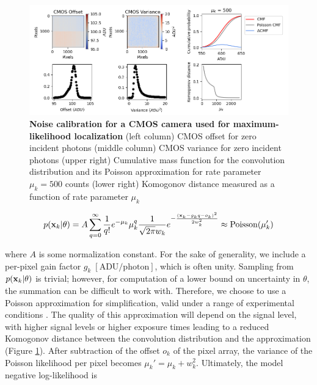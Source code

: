 \begin{figure}[t]
\begin{center}
\includegraphics[width=16cm]{media/Noise.png}
\end{center}
\caption{\textbf{Noise calibration for a CMOS camera used for maximum-likelihood localization} (left column) CMOS offset for zero incident photons (middle column) CMOS variance for zero incident photons (upper right) Cumulative mass function for the convolution distribution and its Poisson approximation for rate parameter $\mu_{k} = 500$ counts (lower right) Komogonov distance measured as a function of rate parameter $\mu_{k}$}
\label{fig:fig2}
\end{figure}

\begin{equation}
p(\bold{x}_{k}\lvert\theta) = A\sum_{q=0}^{\infty} \frac{1}{q!}e^{-\mu_{k}}\mu_{k}^{q}\frac{1}{\sqrt{2\pi}w_{k}}e^{-\frac{(\bold{x}_{k}-g_{k}q-o_{k})^2}{2 w_{k}^{2}}} \approx \mathrm{Poisson}(\mu_{k}')
\end{equation}

where $A$ is some normalization constant. For the sake of generality, we include a per-pixel gain factor $g_{k} \; [\mathrm{ADU}/\mathrm{photon}]$, which is often unity. Sampling from $p(\bold{x}_{k}\lvert\theta)$ is trivial; however, for computation of a lower bound on uncertainty in $\theta$, the summation can be difficult to work with. Therefore, we choose to use a Poisson approximation for simplification, valid under a range of experimental conditions \parencite{Huang2013}. The quality of this approximation will depend on the signal level, with higher signal levels or higher exposure times leading to a reduced Komogonov distance between the convolution distribution and the approximation (Figure \ref{fig:fig2}). After subtraction of the offset $o_{k}$ of the pixel array, the variance of the Poisson likelihood per pixel  becomes $\mu_{k}' = \mu_{k} + w_{k}^{2}$. Ultimately, the model negative log-likelihood is

